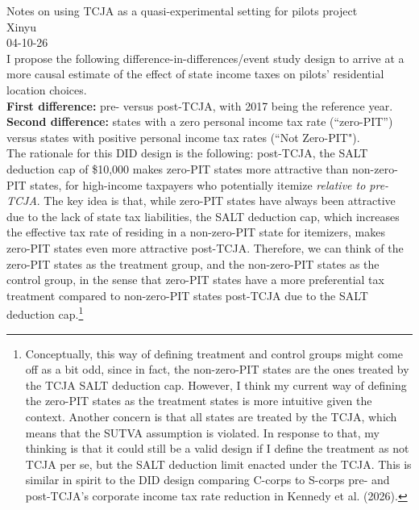 \documentclass{article}
\begin{document}
	\noindent
	Notes on using TCJA as a quasi-experimental setting for pilots project\\
	Xinyu \\
	04-10-26\\

\noindent
I propose the following difference-in-differences/event study design to arrive at a more causal estimate of the effect of state income taxes on pilots' residential location choices. \\

\noindent
\textbf{First difference:} pre- versus post-TCJA, with 2017 being the reference year. \\

\noindent
\textbf{Second difference:} states with a zero personal income tax rate (``zero-PIT'') versus states with positive personal income tax rates (``Not Zero-PIT"). \\

\noindent
The rationale for this DID design is the following: post-TCJA, the SALT deduction cap of \$10,000 makes zero-PIT states more attractive than non-zero-PIT states, for high-income taxpayers who potentially itemize \textit{relative to pre-TCJA}. The key idea is that, while zero-PIT states have always been attractive due to the lack of state tax liabilities, the SALT deduction cap, which increases the effective tax rate of residing in a non-zero-PIT state for itemizers, makes zero-PIT states even more attractive post-TCJA. Therefore, we can think of the zero-PIT states as the treatment group, and the non-zero-PIT states as the control group, in the sense that zero-PIT states have a more preferential tax treatment compared to non-zero-PIT states post-TCJA due to the SALT deduction cap.\footnote{Conceptually, this way of defining treatment and control groups might come off as a bit odd, since in fact, the non-zero-PIT states are the ones treated by the TCJA SALT deduction cap. However, I think my current way of defining the zero-PIT states as the treatment states is more intuitive given the context. Another concern is that all states are treated by the TCJA, which means that the SUTVA assumption is violated. In response to that, my thinking is that it could still be a valid design if I define the treatment as not TCJA per se, but the SALT deduction limit enacted under the TCJA. This is similar in spirit to the DID design comparing C-corps to S-corps pre- and post-TCJA's corporate income tax rate reduction in Kennedy et al. (2026).} \\
\end{document}
